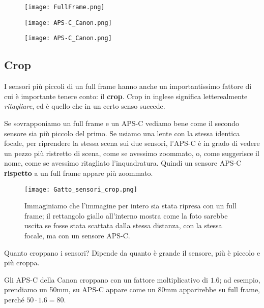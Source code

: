 \begin{multicols}{3}
    \begin{figure}
        \texttt{[image: FullFrame.png]}
    \end{figure}

    \columnbreak

    \begin{figure}
        \texttt{[image: APS-C\_Canon.png]}
    \end{figure}

    \columnbreak

    \begin{figure}
        \texttt{[image: APS-C\_Canon.png]}
    \end{figure}
\end{multicols}

\subsection{Crop} \label{subsec:crop}
I sensori più piccoli di un full frame hanno anche un importantissimo fattore di cui è importante tenere conto: il \textbf{crop}.
Crop in inglese significa letterealmente \textit{ritagliare}, ed è quello che in un certo senso succede.

Se sovrapponiamo un full frame e un APS-C vediamo bene come il secondo sensore sia più piccolo del primo. Se usiamo una lente con la stessa identica focale, per riprendere la stessa scena sui due sensori, l'APS-C è in grado di vedere un pezzo più ristretto di scena, come se avessimo zoommato, o, come suggerisce il nome, come se avessimo ritagliato l'inquadratura. Quindi un sensore APS-C \textbf{rispetto} a un full frame appare più zoommato.

\begin{figure}[h]
    \texttt{[image: Gatto\_sensori\_crop.png]}
    \caption{Immaginiamo che l'immagine per intero sia stata ripresa con un full frame; il rettangolo giallo all'interno mostra come la foto sarebbe uscita se fosse stata scattata dalla stessa distanza, con la stessa focale, ma con un sensore APS-C.}
\end{figure}

Quanto croppano i sensori? Dipende da quanto è grande il sensore, più è piccolo e più croppa.

Gli APS-C della Canon croppano con un fattore moltiplicativo di $1.6$; ad esempio, prendiamo un 50mm, su APS-C appare come un 80mm apparirebbe su full frame, perché $50 \cdot 1.6 = 80$.

